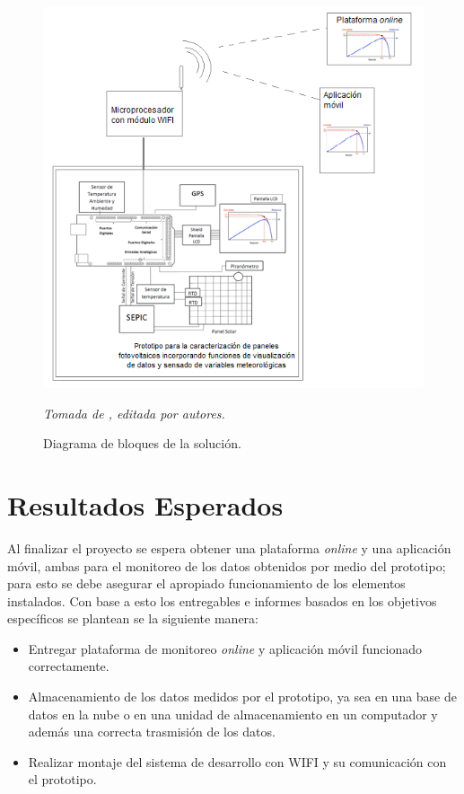 \begin{figure}[ht!]
\begin{centering}
\includegraphics [trim = 0mm 0mm 0mm 0mm, clip,angle=0,scale=0.65]{Images/bloques}%
\caption{\label{fig:bloques}Diagrama de bloques de la solución.}
\textit{Tomada de \cite{Proto}, editada por autores.} 
\par\end{centering}
\end{figure}

\section{Resultados Esperados}

Al finalizar el proyecto se espera obtener una plataforma \textit{online} y una aplicación móvil, ambas para el monitoreo de los datos obtenidos por medio del prototipo; para esto se debe asegurar el apropiado funcionamiento de los elementos instalados. Con base a esto los entregables e informes basados en los objetivos específicos se plantean se la siguiente manera: 

\begin{itemize}
\item Entregar plataforma de monitoreo \textit{online} y aplicación móvil funcionado correctamente.

\item Almacenamiento de los datos medidos por el prototipo, ya sea en una base de datos en la nube o en una unidad de almacenamiento en un computador y además una correcta trasmisión de los datos.

\item Realizar montaje del sistema de desarrollo con WIFI y su comunicación con el prototipo.

\end{itemize}

